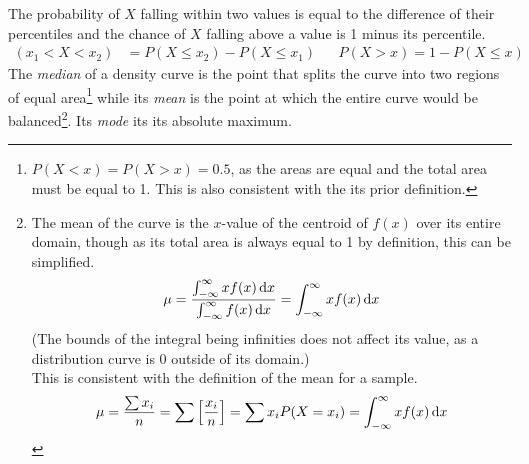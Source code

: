 \documentclass[../AP_Statistics.tex]{subfiles}
\begin{document}
			The probability of $X$ falling within two values is equal to the difference of their percentiles and the chance of $X$ falling above a value is 1 minus its percentile.
			\begin{align*}
				(x_1 < X < x_2) &= P(X \le x_2) - P(X \le x_1) && P(X > x) = 1 - P(X \le x)
			\end{align*}
			The \emph{median} of a density curve is the point that splits the curve into two regions of equal area\footnote{$P(X < x) = P(X > x) = 0.5$, as the areas are equal and the total area must be equal to 1. This is also consistent with the its prior definition.} while its \emph{mean} is the point at which the entire curve would be balanced\footnote{The mean of the curve is the $x$-value of the centroid of $f(x)$ over its entire domain, though as its total area is always equal to 1 by definition, this can be simplified.\[\mu = \frac{\int_{-\infty}^\infty xf(x)\,\mathrm{d} x}{\int_{-\infty}^\infty f(x)\,\mathrm{d} x} = \int_{-\infty}^\infty xf(x)\,\mathrm{d} x\](The bounds of the integral being infinities does not affect its value, as a distribution curve is 0 outside of its domain.)\\This is consistent with the definition of the mean for a sample.\[\mu = \frac{\sum x_i}{n} = \sum\left[\frac{x_i}{n}\right] = \sum x_iP(X = x_i) = \int_{-\infty}^\infty xf(x)\,\mathrm{d} x\]}. Its \emph{mode} its its absolute maximum.
\end{document}
